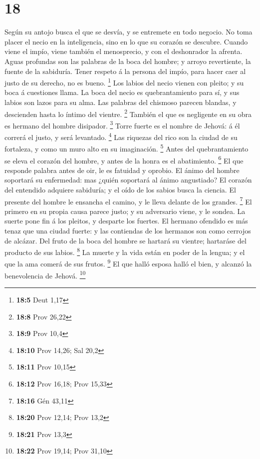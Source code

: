\hypertarget{section-17}{%
\section{18}\label{section-17}}

 Según su antojo busca el que se desvía, y se entremete en
todo negocio.  No toma placer el necio en la inteligencia,
sino en lo que su corazón se descubre.  Cuando viene el
impío, viene también el menosprecio, y con el deshonrador la afrenta.
 Aguas profundas son las palabras de la boca del hombre; y
arroyo revertiente, la fuente de la sabiduría.  Tener
respeto á la persona del impío, para hacer caer al justo de su derecho,
no es bueno. \footnote{\textbf{18:5} Deut 1,17}  Los labios
del necio vienen con pleito; y su boca á cuestiones llama. 
La boca del necio es quebrantamiento para sí, y sus labios son lazos
para su alma.  Las palabras del chismoso parecen blandas, y
descienden hasta lo íntimo del vientre. \footnote{\textbf{18:8} Prov
  26,22}  También el que es negligente en su obra es hermano
del hombre disipador. \footnote{\textbf{18:9} Prov 10,4} 
Torre fuerte es el nombre de Jehová: á él correrá el justo, y será
levantado. \footnote{\textbf{18:10} Prov 14,26; Sal 20,2} 
Las riquezas del rico son la ciudad de su fortaleza, y como un muro alto
en su imaginación. \footnote{\textbf{18:11} Prov 10,15} 
Antes del quebrantamiento se eleva el corazón del hombre, y antes de la
honra es el abatimiento. \footnote{\textbf{18:12} Prov 16,18; Prov 15,33}
 El que responde palabra antes de oir, le es fatuidad y
oprobio.  El ánimo del hombre soportará su enfermedad: mas
¿quién soportará al ánimo angustiado?  El corazón del
entendido adquiere sabiduría; y el oído de los sabios busca la ciencia.
 El presente del hombre le ensancha el camino, y le lleva
delante de los grandes. \footnote{\textbf{18:16} Gén 43,11}
 El primero en su propia causa parece justo; y su
adversario viene, y le sondea.  La suerte pone fin á los
pleitos, y desparte los fuertes.  El hermano ofendido es
más tenaz que una ciudad fuerte: y las contiendas de los hermanos son
como cerrojos de alcázar.  Del fruto de la boca del hombre
se hartará su vientre; hartaráse del producto de sus labios. \footnote{\textbf{18:20}
  Prov 12,14; Prov 13,2}  La muerte y la vida están en
poder de la lengua; y el que la ama comerá de sus frutos. \footnote{\textbf{18:21}
  Prov 13,3}  El que halló esposa halló el bien, y alcanzó
la benevolencia de Jehová. \footnote{\textbf{18:22} Prov 19,14; Prov
  31,10}

